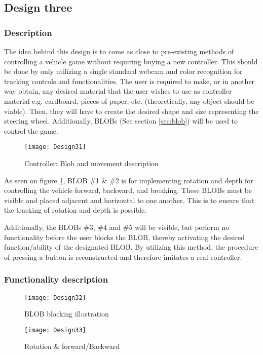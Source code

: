 \subsection{Design three}
\label{design3}
\subsubsection*{Description}
The idea behind this design is to come as close to pre-existing methods of controlling a vehicle game without requiring buying a new controller. This should be done by only utilizing a single standard webcam and color recognition for tracking controls and functionalities. The user is required to make, or in another way obtain, any desired material that the user wishes to use as controller material e.g. cardboard, pieces of paper, etc. (theoretically, any object should be viable). Then, they will have to create the desired shape and size representing the steering wheel. 
Additionally, BLOBs (See section \ref{sec:blob}) will be used to control the game. 
\begin{figure}[h]
\centering
\texttt{[image: Design31]}
\caption{Controller: Blob and movement description}
\label{fig:design31}
\end{figure}

As seen on figure \ref{fig:design31}, BLOB \#1 \& \#2 is for implementing rotation and depth for controlling the vehicle forward, backward, and breaking. These BLOBs must be visible and placed adjacent and horizontal to one another. This is to ensure that the tracking of rotation and depth is possible.

Additionally, the BLOBs \#3, \#4 and \#5 will be visible, but perform no functionality before the user blocks the BLOB, thereby activating the desired function/ability of the designated BLOB. By utilizing this method, the procedure of pressing a button is reconstructed and therefore imitates a real controller.
\bigskip

\subsubsection*{Functionality description} \label{Dfunc}

\begin{figure}[h]
\centering
\caption{BLOB blocking illustration}
\label{fig:design32}
\texttt{[image: Design32]}
\end{figure}

\begin{figure}[h]
\centering
\texttt{[image: Design33]}
\caption{Rotation \& forward/Backward}
\label{fig:design33}
\end{figure}

